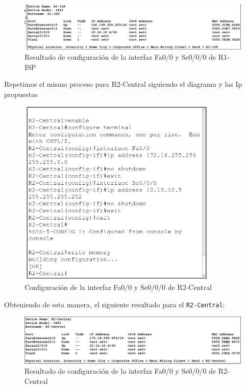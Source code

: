 \documentclass[a4paper,11pt]{article}
\begin{document}
\begin{figure}[h]
    \includegraphics[width=1\textwidth]{images/routers/ip_r1_result.png}
    \caption{Resultado de configuración de la interfaz Fa0/0 y Se0/0/0 de R1-ISP}
\end{figure}

Repetimos el mismo proceso para R2-Central siguiendo el diagrama y las Ip
propuestas

\newpage
\begin{figure}[h]
    \centering
    \includegraphics[width=0.85\textwidth]{images/routers/ip_r2.png}
    \caption{Configuración de la interfaz Fa0/0 y Se0/0/0 de R2-Central}
\end{figure}

Obteniendo de esta manera, el siguiente resultado para el \texttt{R2-Central}:

\begin{figure}[h]

    \includegraphics[width=1\textwidth]{images/routers/ip_r2_result.png}
    \caption{Resultado de configuración de la interfaz Fa0/0 y Se0/0/0 de R2-Central}
\end{figure}
\end{document}

